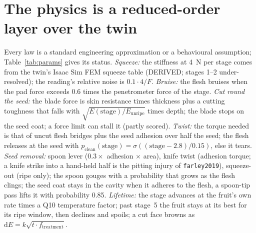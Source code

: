 \documentclass[10.5pt,a4paper]{article}
\begin{document}
\section{The physics is a reduced-order layer over the twin}
Every law is a standard engineering approximation or a behavioural assumption; Table~\ref{tab:params} gives its
status. \emph{Squeeze:} the stiffness at 4~N per stage comes from the twin's Isaac Sim FEM squeeze table (DERIVED;
stages 1--2 under-resolved); the reading's relative noise is $0.1\cdot 4/F$. \emph{Bruise:} the flesh bruises when the
pad force exceeds 0.6 times the penetrometer force of the stage. \emph{Cut round the seed:} the blade force is skin
resistance times thickness plus a cutting toughness that falls with $\sqrt{E(\text{stage})/E_\text{unripe}}$ times
depth; the blade stops on the seed coat; a force limit can stall it (partly scored). \emph{Twist:} the torque needed is
that of uncut flesh bridges plus the seed adhesion over half the seed; the flesh releases at the seed with
$p_\text{clean}(\text{stage})=\sigma((\text{stage}-2.8)/0.15)$, else it tears. \emph{Seed removal:} spoon lever
($0.3\times$ adhesion $\times$ area), knife twist (adhesion torque; a knife strike into a hand-held half is the pitting
injury of \texttt{farley2019}), squeeze-out (ripe only); the spoon gouges with a probability that grows as the flesh
clings; the seed coat stays in the cavity when it adheres to the flesh, a spoon-tip pass lifts it with probability
0.85. \emph{Lifetime:} the stage advances at the fruit's own rate times a Q10 temperature factor; past stage~5 the
fruit stays at its best for its ripe window, then declines and spoils; a cut face browns as $\mathrm{d}E = k\sqrt{t
\cdot f_\text{treatment}}$.
\end{document}

